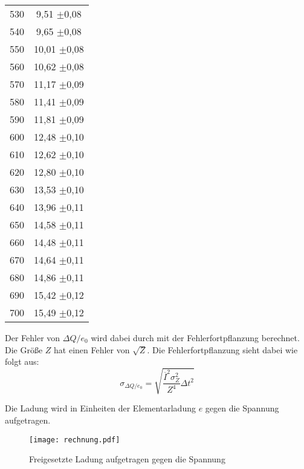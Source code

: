 \begin{table}[H]
\begin{tabular}{c c}
      530 &        9,51    $\pm$0,08 \\
      540 &        9,65    $\pm$0,08 \\
      550 &        10,01   $\pm$0,08 \\
      560 &        10,62   $\pm$0,08 \\
      570 &        11,17   $\pm$0,09 \\
      580 &        11,41   $\pm$0,09 \\
      590 &        11,81   $\pm$0,09 \\
      600 &        12,48   $\pm$0,10 \\
      610 &        12,62   $\pm$0,10 \\
      620 &        12,80   $\pm$0,10 \\
      630 &        13,53   $\pm$0,10 \\
      640 &        13,96   $\pm$0,11 \\
      650 &        14,58   $\pm$0,11 \\
      660 &        14,48   $\pm$0,11 \\
      670 &        14,64   $\pm$0,11 \\
      680 &        14,86   $\pm$0,11 \\
      690 &        15,42   $\pm$0,12 \\
      700 &        15,49   $\pm$0,12 \\
    \bottomrule
  \end{tabular}
\end{table}

Der Fehler von $\Delta Q/e_0$ wird dabei durch mit der Fehlerfortpflanzung berechnet. Die Größe $Z$ hat einen Fehler von $\sqrt{Z}$.
Die Fehlerfortpflanzung sieht dabei wie folgt aus:
\begin{equation*}
  \sigma_{\Delta Q/e_0} =\sqrt{ \frac{\overline{I}^{2} \sigma_{Z}^{2}}{Z^{4}} \Delta t^{2}}
\end{equation*}

Die Ladung wird in Einheiten der Elementarladung $e$ gegen die Spannung aufgetragen.

\begin{figure}
  \centering
  \texttt{[image: rechnung.pdf]}
  \caption{Freigesetzte Ladung aufgetragen gegen die Spannung}
  \label{fig:plot}
\end{figure}
